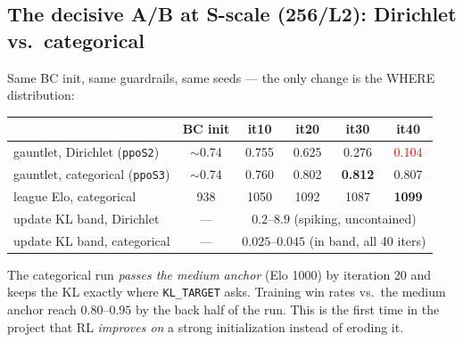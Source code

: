 \documentclass[11pt]{article}
\newcommand{\cd}[1]{\texttt{#1}}
\begin{document}
\subsection{The decisive A/B at S-scale (256/L2): Dirichlet vs.\ categorical}
Same BC init, same guardrails, same seeds --- the only change is the WHERE distribution:
\begin{center}\small
\begin{tabular}{@{}lccccc@{}}
\toprule
 & BC init & it10 & it20 & it30 & it40 \\
\midrule
gauntlet, Dirichlet (\cd{ppoS2})    & $\sim$0.74 & 0.755 & 0.625 & 0.276 & \textcolor{red}{0.104} \\
gauntlet, categorical (\cd{ppoS3})  & $\sim$0.74 & 0.760 & 0.802 & \textbf{0.812} & 0.807 \\
league Elo, categorical             & 938 & 1050 & 1092 & 1087 & \textbf{1099} \\
update KL band, Dirichlet           & --- & \multicolumn{4}{c}{$0.2$--$8.9$ (spiking, uncontained)} \\
update KL band, categorical         & --- & \multicolumn{4}{c}{$0.025$--$0.045$ (in band, all 40 iters)} \\
\bottomrule
\end{tabular}
\end{center}
The categorical run \emph{passes the medium anchor} (Elo 1000) by iteration 20 and keeps the KL
exactly where \cd{KL\_TARGET} asks. Training win rates vs.\ the medium anchor reach $0.80$--$0.95$
by the back half of the run. This is the first time in the project that RL \emph{improves on} a
strong initialization instead of eroding it.
\end{document}
